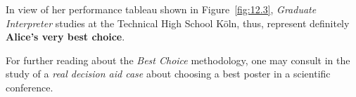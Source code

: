 In view of her performance tableau shown in Figure~\vref{fig:12.3}, \emph{Graduate Interpreter} studies at the Technical High School Köln, thus, represent definitely \textbf{Alice's very best choice}.

\vspace{1cm}

For further reading about the \Rubis \emph{Best Choice} methodology, one may consult in \citet{BIS-2015bestPoster} the study of a \emph{real decision aid case} about choosing a best poster in a scientific conference.
 

%
%

